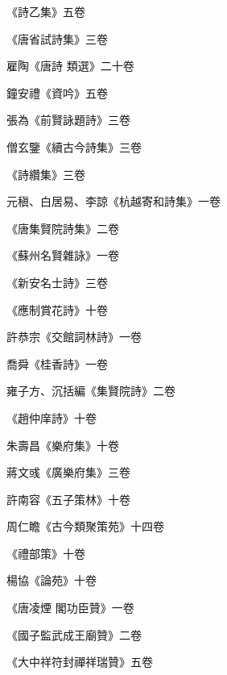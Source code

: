 \begin{pinyinscope}
 《詩乙集》五卷



 《唐省試詩集》三卷



 雇陶《唐詩
 類選》二十卷



 鐘安禮《資吟》五卷



 張為《前賢詠題詩》三卷



 僧玄鑒《續古今詩集》三卷



 《詩纘集》三卷



 元稹、白居易、李諒《杭越寄和詩集》一卷



 《唐集賢院詩集》二卷



 《蘇州名賢雜詠》一卷



 《新安名士詩》三卷



 《應制賞花詩》十卷



 許恭宗《交館詞林詩》一卷



 喬舜《桂香詩》一卷



 雍子方、沉括編《集賢院詩》二卷



 《趙仲庠詩》十卷



 朱壽昌《樂府集》十卷



 蔣文彧《廣樂府集》三卷



 許南容《五子策林》十卷



 周仁瞻《古今類聚策苑》十四卷



 《禮部策》十卷



 楊協《論苑》十卷



 《唐凌煙
 閣功臣贊》一卷



 《國子監武成王廟贊》二卷



 《大中祥符封禪祥瑞贊》五卷




\end{pinyinscope}
